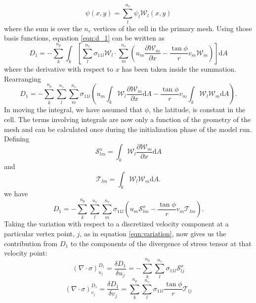 \begin{equation}
\psi(x,y) = \sum_l^{n_v} \psi_l \mathcal{W}_l (x,y)
\end{equation}
where the sum is over the $n_v$ vertices of the cell in the primary mesh.
Using those basis functions, equation \ref{eqn:d_1} can be written as 
\begin{equation}
D_1=-\sum_k^{n_p} \int_k \left[ \sum_{l}^{n_v} \sigma_{11{l}} \mathcal{W}_{l} \cdot \sum_{m}^{n_v} \left(u_{m} \frac{\partial{\mathcal{W}_{m}}}{\partial{x}} - \frac{\tan{\phi}}{r} v_{m} \mathcal{W}_{m} \right) \right]\mathrm{d}A
\end{equation}
where the derivative with respect to $x$ has been taken inside the summation.
Rearranging
\begin{equation}
D_1= -\sum_k^{n_p} \sum_{l}^{n_v} \sum_{m}^{n_v} \sigma_{11{l}}\left( u_{m} \int_k  \mathcal{W}_{l}   \frac{\partial{\mathcal{W}_{m}}}{\partial{x}}  \mathrm{d}A  - \frac{\tan{\phi}}{r}  v_{m} \int_k \mathcal{W}_{l} \mathcal{W}_{m}  \mathrm{d}A  \right).
\end{equation}
In moving the integral, we have assumed that $\phi$, the latitude, is constant in the cell. The terms involving integrals are now only a function of the geometry of the mesh and can be calculated once during the initialization phase of the model run. Defining 
\begin{equation}
\mathcal{S}^x_{lm} = \int_k  \mathcal{W}_{l}   \frac{\partial{\mathcal{W}_{m}}}{\partial{x}}  \mathrm{d}A
\end{equation}
and
\begin{equation}
\mathcal{T}_{lm} = \int_k \mathcal{W}_{l} \mathcal{W}_{m}  \mathrm{d}A.
\end{equation}
we have
\begin{equation}
D_1= -\sum_k^{n_p} \sum_{l}^{n_v} \sum_{m}^{n_v} \sigma_{11{l}}\left( u_{m} \mathcal{S}^x_{lm}  - \frac{\tan{\phi}}{r}  v_{m} \mathcal{T}_{lm}  \right).
\end{equation}
Taking the variation with respect to a discretized velocity component at a particular vertex point, $j$, as in equation \ref{eqn:variation}, now gives us the contribution from $D_1$ to the components of the divergence of stress tensor at that velocity point:
\begin{equation}
(\nabla \cdot \sigma)_{u_j}^{D_1} = \frac{\delta D_1}{\delta u_{j}}= -\sum_k^{n_p} \sum_{l}^{n_v}  \sigma_{11{l}} \mathcal{S}^x_{lj}
\end{equation}
\begin{equation}
(\nabla \cdot \sigma)_{v_j}^{D_1} = \frac{\delta D_1}{\delta v_{j}}= \sum_k^{n_p} \sum_{l}^{n_v}  \sigma_{11{l}}  \frac{\tan{\phi}}{r} \mathcal{T}_{lj}
\end{equation}
